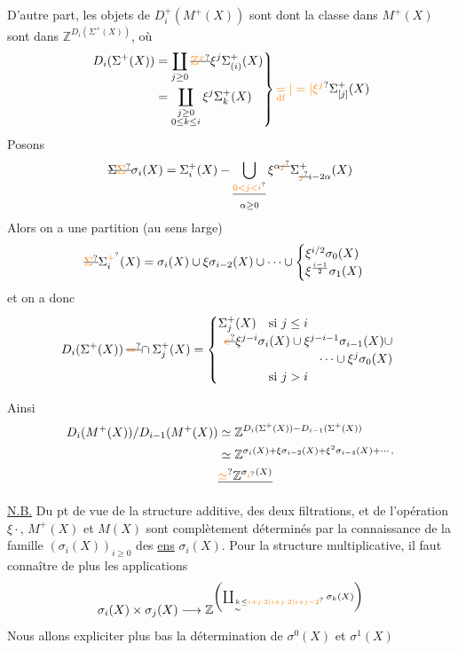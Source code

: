 D'autre part, les objets de $D_i^+(M^+(X))$ sont   dont la classe dans  $M^+(X)$ sont dans $\mathbb Z^{D_i(\Sigma^+(X))}$, où
\[
\left.\begin{aligned}
D_i(\Sigma^+(X))&=\coprod_{j\geq0}\deleted{\unsure{\mathbb Z^{x}}}\xi^j\Sigma^+_{(i)}(X)\\
&=\coprod_{\substack{j\geq0\\0\leq k\leq i}}\xi^j\Sigma_k^+(X)
\end{aligned}\right\}\unsure{\underset{\mathrm{df}}{=}|\mathrel{=}|\xi^j}\Sigma^+_{[j]}(X)
\]
Posons
\[
\deleted{\Sigma}\deleted{\unsure{\Sigma}}\sigma_i(X)=\Sigma_i^+(X)-\bigcup_{\substack{\deleted{\unsure{0<j<i}}\\\alpha\geq0}}\xi^{\alpha\deleted{\unsure{j}}}\Sigma^+_{\deleted{\unsure{j}}i-2\alpha}(X)
\]
Alors on a une partition (au sens large)
\[
\deleted{\unsure{\Sigma}}\Sigma^{\unsure{+}}_i(X)=\sigma_i(X)\cup\xi\sigma_{i-2}(X)\cup\dotsb\cup
\begin{cases}\xi^{i/2}\sigma_0(X)\\ \xi^{\frac{i-1}{2}}\sigma_1(X)\end{cases}
\]
et on a donc
\[
D_i(\Sigma^+(X))\mathbin{\deleted{\unsure{=}}\cap}\Sigma_j^+(X)=
\begin{cases}
\Sigma_j^+(X)&\text{si }j\leq i\\
\multicolumn{2}{l}{\deleted{\unsure{e}}\xi^{j-i}\sigma_i(X)\cup\xi^{j-i-1}\sigma_{i-1}(X)\cup}\\
\multicolumn{2}{r}{\dotsb\cup\xi^j\sigma_0(X)}\\
&\text{si }j>i
\end{cases}
\]

Ainsi
\[
\begin{aligned}
D_i(M^+(X))/D_{i-1}(M^+(X))&\simeq\mathbb Z^{D_i(\Sigma^+(X))-D_{i-1}(\Sigma^+(X))}\\
&\simeq\mathbb Z^{\sigma_i(X)+\xi\sigma_{i-2}(X)+\xi^{2}\sigma_{i-4}(X)+\dotsb,}\\
&\deleted{\unsure{\simeq}\mathbb Z^{\sigma_{\unsure{i}}(X)}}
\end{aligned}
\]

\uline{N.B.} Du pt de vue de la structure additive, des deux filtrations, et de l'opération $\xi\cdot$, $M^+(X)$ et $M(X)$ sont complètement déterminés par la connaissance de la famille $(\sigma_i(X))_{i\geq0}$ des \uline{ens} $\sigma_i(X)$.
Pour la structure multiplicative, il faut connaître de plus les applications
\[
\sigma_i(X)\times\sigma_j(X)\longrightarrow
\mathbb Z^{\left(\coprod_{\underset{\sim}{k}\leq\unsure{i+j:2|i+j\cdot2|i+j-2}}\sigma_k(X)\right)}
\]
Nous allons expliciter plus bas la détermination de $\sigma^0(X)$ et $\sigma^1(X)$

